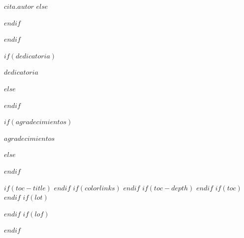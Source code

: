 \hfill {$cita.autor$}
$else$

$endif$

$endif$
\newpage


$if(dedicatoria)$

\thispagestyle{empty}

\vspace*{0.3\textheight}

{$dedicatoria$}

$else$


$endif$
\newpage



$if(agradecimientos)$
\thispagestyle{empty}


$agradecimientos$

$else$


$endif$
\newpage


\begingroup
$if(toc-title)$
\renewcommand*\contentsname{$toc-title$}
$endif$
$if(colorlinks)$
\hypersetup{linkcolor=$if(toccolor)$$toccolor$$else$$endif$}
$endif$
$if(toc-depth)$
\setcounter{tocdepth}{$toc-depth$}
$endif$
$if(toc)$
\tableofcontents
$endif$
$if(lot)$
\listoftables
$endif$
$if(lof)$
\listoffigures
$endif$
\endgroup
